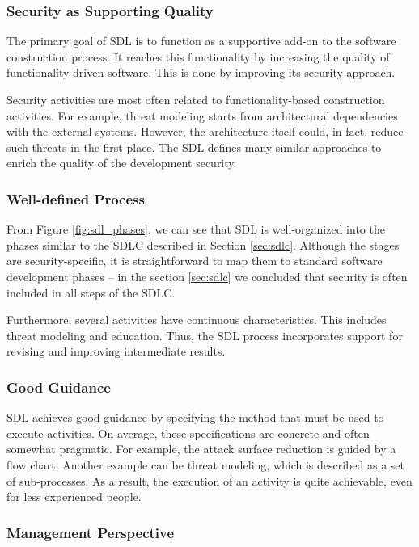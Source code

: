 \documentclass[12pt,a4,twoside]{article}
\begin{document}
\subsubsection{Security as Supporting Quality}

The primary goal of SDL is to function as a supportive add-on to the software construction process. It reaches this functionality by increasing the quality of functionality-driven software. This is done by improving its security approach.

Security activities are most often related to functionality-based construction activities. For example, threat modeling starts from architectural dependencies with the external systems. However, the architecture itself could, in fact, reduce such threats in the first place. The SDL defines many similar approaches to enrich the quality of the development security.

\subsubsection{Well-defined Process}

From Figure \ref{fig:sdl_phases}, we can see that SDL is well-organized into the phases similar to the SDLC described in Section \ref{sec:sdlc}. Although the stages are security-specific, it is straightforward to map them to standard software development phases -- in the section \ref{sec:sdlc} we concluded that security is often included in all steps of the SDLC.

Furthermore, several activities have continuous characteristics. This includes threat modeling and education. Thus, the SDL process incorporates support for revising and improving intermediate results.

\subsubsection{Good Guidance}

SDL achieves good guidance by specifying the method that must be used to execute activities.  On average, these specifications are concrete and often somewhat pragmatic. For example, the attack surface reduction is guided by a flow chart. Another example can be threat modeling, which is described as a set of sub-processes. As a result, the execution of an activity is quite achievable, even for less experienced people.

\subsubsection{Management Perspective}
\end{document}
